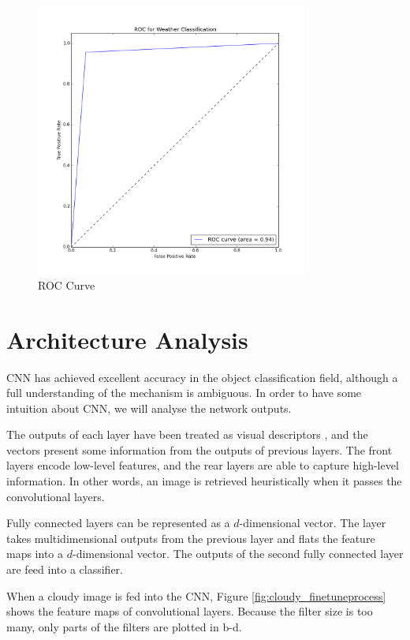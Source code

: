 \begin{figure}[!htb]
    \centering
	\includegraphics[width=0.8\textwidth]{ROCWeatherClassification.png}
    \caption{ROC Curve}%
    \label{fig:WeatherClassificationROC}%
\end{figure}

\section{Architecture Analysis}

CNN has achieved excellent accuracy in the object classification field, although a full understanding of the mechanism is ambiguous. In order to have some intuition about CNN, we will analyse the network outputs.

The outputs of each layer have been treated as visual descriptors \citep{razavian2014cnn}, and the vectors present some information from the outputs of previous layers. The front layers encode low-level features, and the rear layers are able to capture high-level information. In other words, an image is retrieved heuristically when it passes the convolutional layers.

Fully connected layers can be represented as a $d$-dimensional vector. The layer takes multidimensional outputs from the previous layer and flats the feature maps into a $d$-dimensional vector. The outputs of the second fully connected layer are feed into a classifier.

When a cloudy image is fed into the CNN, Figure \ref{fig:cloudy_finetuneprocess} shows the feature maps of convolutional layers. Because the filter size is too many, only parts of the filters are plotted in b-d.

